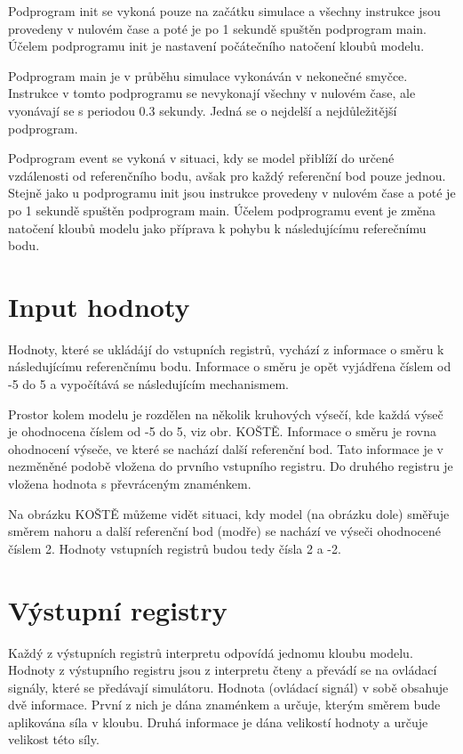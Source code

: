 Podprogram init se vykoná pouze na začátku simulace a všechny instrukce jsou provedeny v nulovém čase a poté je po 1 sekundě spuštěn podprogram main.
Účelem podprogramu init je nastavení počátečního natočení kloubů modelu.

Podprogram main je v průběhu simulace vykonáván v nekonečné smyčce.
Instrukce v tomto podprogramu se nevykonají všechny v nulovém čase, ale vyonávají se s periodou 0.3 sekundy.
Jedná se o nejdelší a nejdůležitější podprogram.

Podprogram event se vykoná v situaci, kdy se model přiblíží do určené vzdálenosti od referenčního bodu, avšak pro každý referenční bod pouze jednou.
Stejně jako u podprogramu init jsou instrukce provedeny v nulovém čase a poté je po 1 sekundě spuštěn podprogram main.
Účelem podprogramu event je změna natočení kloubů modelu jako příprava k pohybu k následujícímu referečnímu bodu.

\section{Input hodnoty}

Hodnoty, které se ukládájí do vstupních registrů, vychází z informace o směru k následujícímu referenčnímu bodu.
Informace o směru je opět vyjádřena číslem od -5 do 5 a vypočítává se následujícím mechanismem.

Prostor kolem modelu je rozdělen na několik kruhových výsečí, kde každá výseč je ohodnocena číslem od -5 do 5, viz obr. KOŠTĚ.
Informace o směru je rovna ohodnocení výseče, ve které se nachází další referenční bod.
Tato informace je v nezměněné podobě vložena do prvního vstupního registru.
Do druhého registru je vložena hodnota s převráceným znaménkem.

Na obrázku KOŠTĚ můžeme vidět situaci, kdy model (na obrázku dole) směřuje směrem nahoru a další referenční bod (modře) se nachází ve výseči ohodnocené číslem 2.
Hodnoty vstupních registrů budou tedy čísla 2 a -2.

\section{Výstupní registry}

Každý z výstupních registrů interpretu odpovídá jednomu kloubu modelu.
Hodnoty z výstupního registru jsou z interpretu čteny a převádí se na ovládací signály, které se předávají simulátoru.
Hodnota (ovládací signál) v sobě obsahuje dvě informace.
První z nich je dána znaménkem a určuje, kterým směrem bude aplikována síla v kloubu.
Druhá informace je dána velikostí hodnoty a určuje velikost této síly.

